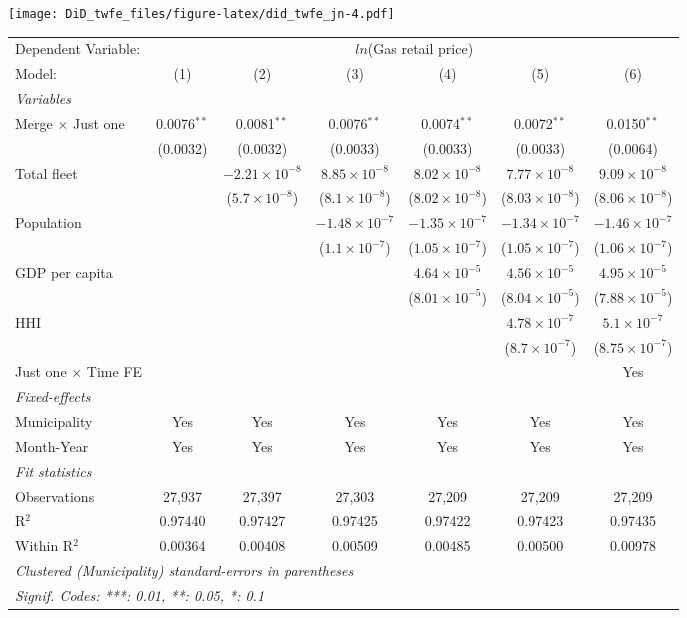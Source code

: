 \documentclass[
]{article}
\begin{document}
\texttt{[image: DiD\_twfe\_files/figure-latex/did\_twfe\_jn-4.pdf]}

\begin{tabular}{lcccccc}
\tabularnewline\midrule\midrule
Dependent Variable:&\multicolumn{6}{c}{$ln$(Gas retail price)}\\
Model:&(1) & (2) & (3) & (4) & (5) & (6)\\
\midrule \emph{Variables}&   &   &   &   &   &  \\
Merge $\times $ Just one & 0.0076$^{**}$ & 0.0081$^{**}$ & 0.0076$^{**}$ & 0.0074$^{**}$ & 0.0072$^{**}$ & 0.0150$^{**}$\\
  &(0.0032) & (0.0032) & (0.0033) & (0.0033) & (0.0033) & (0.0064)\\
Total fleet &    & $-2.21\times 10^{-8}$ & $8.85\times 10^{-8}$ & $8.02\times 10^{-8}$ & $7.77\times 10^{-8}$ & $9.09\times 10^{-8}$\\
  &   & ($5.7\times 10^{-8}$) & ($8.1\times 10^{-8}$) & ($8.02\times 10^{-8}$) & ($8.03\times 10^{-8}$) & ($8.06\times 10^{-8}$)\\
Population &    &    & $-1.48\times 10^{-7}$ & $-1.35\times 10^{-7}$ & $-1.34\times 10^{-7}$ & $-1.46\times 10^{-7}$\\
  &   &    & ($1.1\times 10^{-7}$) & ($1.05\times 10^{-7}$) & ($1.05\times 10^{-7}$) & ($1.06\times 10^{-7}$)\\
GDP per capita &    &    &    & $4.64\times 10^{-5}$ & $4.56\times 10^{-5}$ & $4.95\times 10^{-5}$\\
  &   &    &    & ($8.01\times 10^{-5}$) & ($8.04\times 10^{-5}$) & ($7.88\times 10^{-5}$)\\
HHI &    &    &    &    & $4.78\times 10^{-7}$ & $5.1\times 10^{-7}$\\
  &   &    &    &    & ($8.7\times 10^{-7}$) & ($8.75\times 10^{-7}$)\\
Just one $\times$ Time FE &  &  &  &  &  & Yes\\
\midrule \emph{Fixed-effects}&   &   &   &   &   &  \\
Municipality & Yes & Yes & Yes & Yes & Yes & Yes\\
Month-Year & Yes & Yes & Yes & Yes & Yes & Yes\\
\midrule \emph{Fit statistics}&  & & & & & \\
Observations & 27,937&27,397&27,303&27,209&27,209&27,209\\
R$^2$ & 0.97440&0.97427&0.97425&0.97422&0.97423&0.97435\\
Within R$^2$ & 0.00364&0.00408&0.00509&0.00485&0.00500&0.00978\\
\midrule\midrule\multicolumn{7}{l}{\emph{Clustered (Municipality) standard-errors in parentheses}}\\
\multicolumn{7}{l}{\emph{Signif. Codes: ***: 0.01, **: 0.05, *: 0.1}}\\
\end{tabular}
\end{document}
